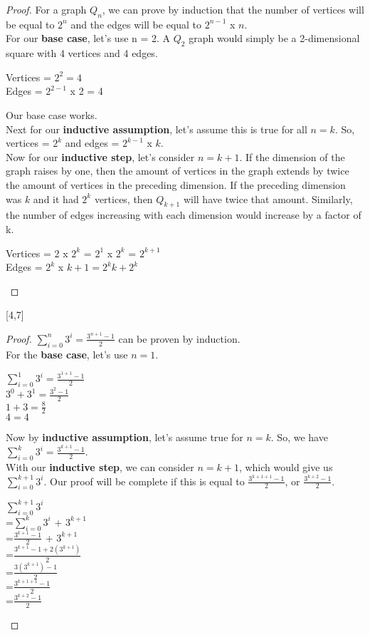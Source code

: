 \documentclass[12pt,letterpaper]{exam}
\begin{document}
\begin{proof}
For a graph $Q_n$, we can prove by induction that the number of vertices will be equal to $2^n$ and the edges will be equal to $2^{n-1}$ x $n$.\\
For our \textbf{base case}, let's use n = 2. A $Q_2$ graph would simply be a 2-dimensional square with 4 vertices and 4 edges.\\
\begin{center}Vertices = $2^2 = 4$\\Edges = $2^{2-1}$ x 2 = 4\\
\end{center}Our base case works.\\
Next for our \textbf{inductive assumption}, let's assume this is true for all $n=k$. So, vertices = $2^k$ and edges = $2^{k-1}$ x $k$.\\
Now for our \textbf{inductive step}, let's consider $n=k+1$. If the dimension of the graph raises by one, then the amount of vertices in the graph extends by twice the amount of vertices in the preceding dimension. If the preceding dimension was $k$ and it had $2^k$ vertices, then $Q_{k+1}$ will have twice that amount. Similarly, the number of edges increasing with each dimension would increase by a factor of k.\\
\begin{center} Vertices = 2 x $2^k$ = $2^1$ x $2^k$ = $2^{k+1}$\\
Edges = $2^{k}$ x $k+1=2^kk+2^k$
\end{center}
\end{proof}


[4,7]
\begin{proof}
$\sum_{i=0}^{n}3^i = \frac{3^{n+1}-1}{2}$ can be proven by induction.\\
For the \textbf{base case}, let's use $n=1$.
\begin{center}$\sum_{i=0}^{1}3^i = \frac{3^{1+1}-1}{2}$\\
$3^0 + 3^1 = \frac{3^2-1}{2}$\\
$1+3 = \frac{8}{2}$\\
$4=4$\\
\end{center}
Now by \textbf{inductive assumption}, let's assume true for $n=k$. So, we have $\sum_{i=0}^{k}3^i = \frac{3^{k+1}-1}{2}$.\\
With our \textbf{inductive step}, we can consider $n=k+1$, which would give us $\sum_{i=0}^{k+1}3^i$. Our proof will be complete if this is equal to $\frac{3^{k+1+1}-1}{2}$, or $\frac{3^{k+2}-1}{2}$.
\begin{center}
$\sum_{i=0}^{k+1}3^i$\\
=$\sum_{i=0}^{k}3^i$ + $3^{k+1}$\\
=$\frac{3^{k+1}-1}{2}$ + $3^{k+1}$\\
=$\frac{3^{k+1}-1+ 2(3^{k+1})}{2}$\\
=$\frac{3(3^{k+1})-1}{2}$\\
=$\frac{3^{k+1+1}-1}{2}$\\
=$\frac{3^{k+2}-1}{2}$
\\
\end{center}
\end{proof}
\end{document}
